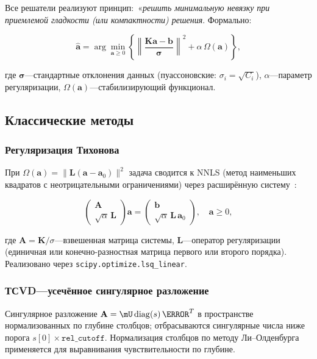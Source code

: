 \documentclass[12pt,a4paper]{article}
\newcommand{\va}{\mathbf{a}}
\newcommand{\vb}{\mathbf{b}}
\newcommand{\mK}{\mathbf{K}}
\newcommand{\mA}{\mathbf{A}}
\newcommand{\mL}{\mathbf{L}}
\begin{document}
Все решатели реализуют принцип:\ «\textit{решить минимальную невязку}
\textit{при приемлемой гладкости (или компактности) решения}\».
Формально:

\begin{equation}
  \hat{\va} = \arg\min_{\va \geq 0}
  \left\{
  \left\|\frac{\mK\va - \vb}{\bm{\sigma}}\right\|^2
  + \alpha\, \Omega(\va)\right\},
  \label{eq:general}
\end{equation}

где $\bm{\sigma}$---стандартные отклонения данных (пуассоновские:
$\sigma_i = \sqrt{C_i}$), $\alpha$---параметр регуляризации,
$\Omega(\va)$---стабилизирующий функционал.

\subsection{Классические методы}
\label{sub:classical}

\subsubsection{Регуляризация Тихонова}

При $\Omega(\va) = \|\mL(\va - \va_0)\|^2$ задача сводится к NNLS
(метод наименьших квадратов с неотрицательными ограничениями)
через расширённую систему~\citep{Tikhonov1977, Hansen1998}:

\begin{equation}
  \begin{pmatrix} \mA \\ \sqrt{\alpha}\,\mL \end{pmatrix} \va =
  \begin{pmatrix} \vb \\ \sqrt{\alpha}\,\mL\,\va_0 \end{pmatrix},
  \quad \va \geq 0,
\end{equation}

где $\mA = \mK / \sigma$---взвешенная матрица системы,
$\mL$---оператор регуляризации (единичная или конечно-разностная
матрица первого или второго порядка).
Реализовано через \texttt{scipy.optimize.lsq\_linear}.

\subsubsection{ТСVD---усечённое сингулярное разложение}

Сингулярное разложение $\mA = \mU\,\mathrm{diag}(s)\,\mV^T$
в пространстве нормализованных по глубине столбцов;
отбрасываются сингулярные числа ниже порога $s[0] \times \texttt{rel\_cutoff}$.
Нормализация столбцов по методу Ли--Олденбурга~\citep{LiOldenburg1996}
применяется для выравнивания чувствительности по глубине.
\end{document}
